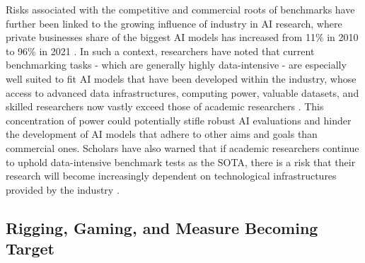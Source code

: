 Risks associated with the competitive and commercial roots of benchmarks have further been linked to the growing influence of industry in AI research, where private businesses share of the biggest AI models has increased from 11\% in 2010 to 96\% in 2021 \cite{ahmed2023}. In such a context, researchers have noted that current benchmarking tasks - which are generally highly data-intensive - are especially well suited to fit AI models that have been developed within the industry, whose access to advanced data infrastructures, computing power, valuable datasets, and skilled researchers now vastly exceed those of academic researchers \cite{ahmed2023}. 
This concentration of power could potentially stifle robust AI evaluations and hinder the development of AI models that adhere to other aims and goals than commercial ones. Scholars have also warned that if academic researchers continue to uphold data-intensive benchmark tests as the SOTA, there is a risk that their research will become increasingly dependent on technological infrastructures provided by the industry \cite{koch2024}. 



\subsection{Rigging, Gaming, and Measure Becoming Target}

